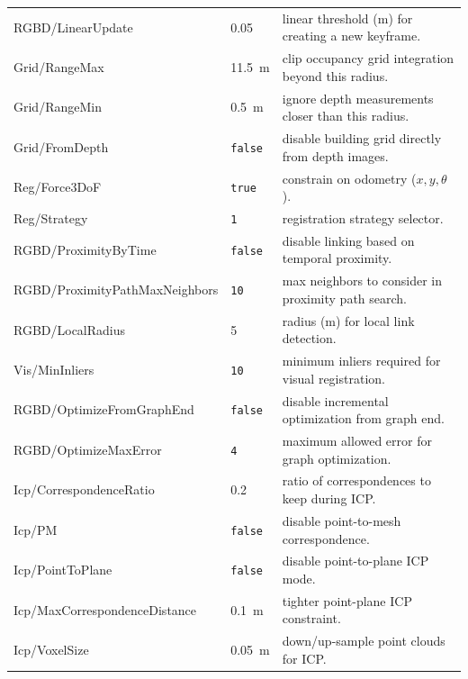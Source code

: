 \begin{longtable}{@{}llp{}@{}}
  RGBD/LinearUpdate              & \num{0.05}           & linear threshold (m) for creating a new keyframe. \\[-4pt]
  Grid/RangeMax                  & \SI{11.5}{m}         & clip occupancy grid integration beyond this radius. \\[-4pt]
  Grid/RangeMin                  & \SI{0.5}{m}          & ignore depth measurements closer than this radius. \\[-4pt]
  Grid/FromDepth                 & \texttt{false}       & disable building grid directly from depth images. \\[-4pt]
  Reg/Force3DoF                  & \texttt{true}        & constrain on odometry ($x,y,\theta$). \\[-4pt]
  Reg/Strategy                   & \texttt{1}           & registration strategy selector. \\[-4pt]
  RGBD/ProximityByTime           & \texttt{false}       & disable linking based on temporal proximity. \\[-4pt]
  RGBD/ProximityPathMaxNeighbors & \texttt{10}          & max neighbors to consider in proximity path search. \\[-4pt]
  RGBD/LocalRadius               & \num{5}              & radius (m) for local link detection. \\[-4pt]
  Vis/MinInliers                 & \texttt{10}          & minimum inliers required for visual registration. \\[-4pt]
  RGBD/OptimizeFromGraphEnd      & \texttt{false}       & disable incremental optimization from graph end. \\[-4pt]
  RGBD/OptimizeMaxError          & \texttt{4}           & maximum allowed error for graph optimization. \\[-4pt]
  Icp/CorrespondenceRatio        & \num{0.2}            & ratio of correspondences to keep during ICP. \\[-4pt]
  Icp/PM                         & \texttt{false}       & disable point-to-mesh correspondence. \\[-4pt]
  Icp/PointToPlane               & \texttt{false}       & disable point-to-plane ICP mode. \\[-4pt]
  Icp/MaxCorrespondenceDistance  & \SI{0.1}{m}          & tighter point-plane ICP constraint. \\[-4pt]
  Icp/VoxelSize                  & \SI{0.05}{m}         & down/up-sample point clouds for ICP. \\
  \bottomrule
\end{longtable}


